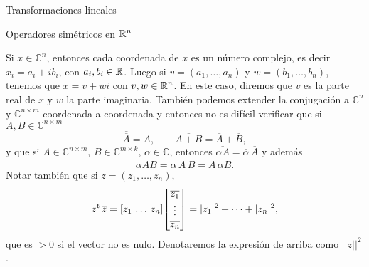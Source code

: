 \begin{chapter}{Transformaciones lineales}
\begin{section}{Operadores simétricos en $\mathbb R^n$}
\begin{obs}
        Si $x \in \mathbb{C}^n$,  entonces cada coordenada de $x$ es un número complejo,  es decir $x_i = a_i + ib_i$, con $a_i,b_i \in \mathbb R$. Luego si $v = (a_1,\ldots,a_n)$ y $w = (b_1,\ldots,b_n)$, tenemos que  $x = v + wi$  con  $v,w \in \mathbb R^n$.  En  este caso, diremos que $v$  es la parte real de $x$ y $w$ la parte imaginaria. También podemos extender la conjugación a $\mathbb{C}^n$ y  $\mathbb{C}^{n \times m}$ coordenada a coordenada y entonces no es difícil verificar que si $A, B \in \mathbb{C}^{n \times m}$
        \begin{equation*}\overline{\overline{A}} = A,\qquad \overline{A+B} = \overline{A}+\overline{B},
        \end{equation*}
        y que si $A\in \mathbb{C}^{n \times m}$, $ B \in \mathbb{C}^{m \times k}$, $\alpha \in \mathbb{C}$, entonces $\overline{\alpha A} =\overline{\alpha}\, \overline{A}$ y además
        \begin{equation*}\overline{\alpha A B} =\overline{\alpha}\, \overline{A}\,\overline{B} = \overline{A}\,\overline{\alpha B}.
        \end{equation*} 
        Notar también que si  $z = (z_1,\ldots,z_n)$, 
        \begin{equation*}z^{\operatorname{t}} \, \overline{z} = [ z_1 \, \ldots \, z_n ]
        {\begin{bmatrix} \overline{z_1} \\\vdots \\\overline{z_n} \end{bmatrix}} = |z_1|^2+\cdots+|z_n|^2,
        \end{equation*}   
        que es $>0$ si el vector no es nulo. Denotaremos la expresión de arriba como $||z||^2$.
        
    \end{obs}
    

\end{section}
\end{chapter}
